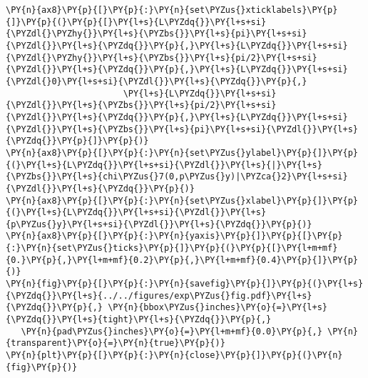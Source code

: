 \begin{Verbatim}[commandchars=\\\{\}]
\PY{n}{ax8}\PY{p}{[}\PY{p}{:}\PY{n}{set\PYZus{}xticklabels}\PY{p}{]}\PY{p}{(}\PY{p}{[}\PY{l+s}{L\PYZdq{}}\PY{l+s+si}{\PYZdl{}\PYZhy{}}\PY{l+s}{\PYZbs{}}\PY{l+s}{pi}\PY{l+s+si}{\PYZdl{}}\PY{l+s}{\PYZdq{}}\PY{p}{,}\PY{l+s}{L\PYZdq{}}\PY{l+s+si}{\PYZdl{}\PYZhy{}}\PY{l+s}{\PYZbs{}}\PY{l+s}{pi/2}\PY{l+s+si}{\PYZdl{}}\PY{l+s}{\PYZdq{}}\PY{p}{,}\PY{l+s}{L\PYZdq{}}\PY{l+s+si}{\PYZdl{}0}\PY{l+s+si}{\PYZdl{}}\PY{l+s}{\PYZdq{}}\PY{p}{,}
                       \PY{l+s}{L\PYZdq{}}\PY{l+s+si}{\PYZdl{}}\PY{l+s}{\PYZbs{}}\PY{l+s}{pi/2}\PY{l+s+si}{\PYZdl{}}\PY{l+s}{\PYZdq{}}\PY{p}{,}\PY{l+s}{L\PYZdq{}}\PY{l+s+si}{\PYZdl{}}\PY{l+s}{\PYZbs{}}\PY{l+s}{pi}\PY{l+s+si}{\PYZdl{}}\PY{l+s}{\PYZdq{}}\PY{p}{]}\PY{p}{)}
\PY{n}{ax8}\PY{p}{[}\PY{p}{:}\PY{n}{set\PYZus{}ylabel}\PY{p}{]}\PY{p}{(}\PY{l+s}{L\PYZdq{}}\PY{l+s+si}{\PYZdl{}}\PY{l+s}{|}\PY{l+s}{\PYZbs{}}\PY{l+s}{chi\PYZus{}7(0,p\PYZus{}y)|\PYZca{}2}\PY{l+s+si}{\PYZdl{}}\PY{l+s}{\PYZdq{}}\PY{p}{)}
\PY{n}{ax8}\PY{p}{[}\PY{p}{:}\PY{n}{set\PYZus{}xlabel}\PY{p}{]}\PY{p}{(}\PY{l+s}{L\PYZdq{}}\PY{l+s+si}{\PYZdl{}}\PY{l+s}{p\PYZus{}y}\PY{l+s+si}{\PYZdl{}}\PY{l+s}{\PYZdq{}}\PY{p}{)}
\PY{n}{ax8}\PY{p}{[}\PY{p}{:}\PY{n}{yaxis}\PY{p}{]}\PY{p}{[}\PY{p}{:}\PY{n}{set\PYZus{}ticks}\PY{p}{]}\PY{p}{(}\PY{p}{[}\PY{l+m+mf}{0.}\PY{p}{,}\PY{l+m+mf}{0.2}\PY{p}{,}\PY{l+m+mf}{0.4}\PY{p}{]}\PY{p}{)}
\PY{n}{fig}\PY{p}{[}\PY{p}{:}\PY{n}{savefig}\PY{p}{]}\PY{p}{(}\PY{l+s}{\PYZdq{}}\PY{l+s}{../../figures/exp\PYZus{}fig.pdf}\PY{l+s}{\PYZdq{}}\PY{p}{,} \PY{n}{bbox\PYZus{}inches}\PY{o}{=}\PY{l+s}{\PYZdq{}}\PY{l+s}{tight}\PY{l+s}{\PYZdq{}}\PY{p}{,}
   \PY{n}{pad\PYZus{}inches}\PY{o}{=}\PY{l+m+mf}{0.0}\PY{p}{,} \PY{n}{transparent}\PY{o}{=}\PY{n}{true}\PY{p}{)}
\PY{n}{plt}\PY{p}{[}\PY{p}{:}\PY{n}{close}\PY{p}{]}\PY{p}{(}\PY{n}{fig}\PY{p}{)}
\end{Verbatim}

